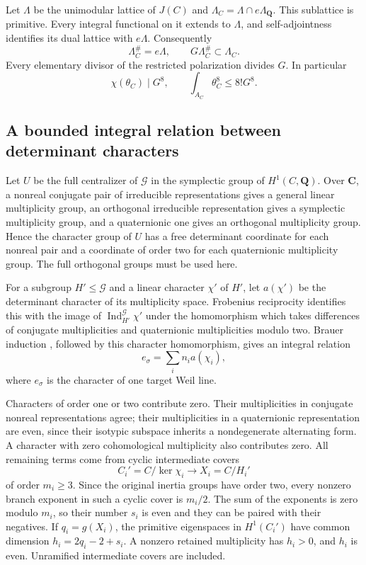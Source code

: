 \documentclass[11pt]{article}
\theoremstyle{definition}
\theoremstyle{remark}
\newcommand{\Q}{\mathbf Q}
\newcommand{\C}{\mathbf C}
\begin{document}
Let $\Lambda$ be the unimodular lattice of $J(C)$ and
$\Lambda_C=\Lambda\cap e\Lambda_\Q$. This sublattice is primitive.
Every integral functional on it extends to $\Lambda$, and
self-adjointness identifies its dual lattice with $e\Lambda$.
Consequently
\[
 \Lambda_C^{\#}=e\Lambda,\qquad
 G\Lambda_C^{\#}\subset\Lambda_C.
\]
Every elementary divisor of the restricted polarization divides $G$.
In particular
\begin{equation}\label{eq:eis-source-volume}
 \chi(\theta_C)\mid G^8,
 \qquad \int_{A_C}\theta_C^8\le8!G^8.
\end{equation}

\subsection{A bounded integral relation between determinant characters}

Let $U$ be the full centralizer of $\mathcal G$ in the symplectic group
of $H^1(C,\Q)$. Over $\C$, a nonreal conjugate pair of irreducible
representations gives a general linear multiplicity group, an orthogonal
irreducible representation gives a symplectic multiplicity group, and
a quaternionic one gives an orthogonal multiplicity group. Hence the
character group of $U$ has a free determinant coordinate for each
nonreal pair and a coordinate of order two for each quaternionic
multiplicity group. The full orthogonal groups must be used here.

For a subgroup $H'\le\mathcal G$ and a linear character $\chi'$ of
$H'$, let $a(\chi')$ be the determinant character of its multiplicity
space. Frobenius reciprocity identifies this with the image of
$\operatorname{Ind}_{H'}^{\mathcal G}\chi'$ under the homomorphism
which takes differences of conjugate multiplicities and quaternionic
multiplicities modulo two. Brauer induction \cite[\S10.5, Theorem~20, p.~78]{SerreRepresentations}, followed by this character homomorphism, gives an integral relation
\begin{equation}\label{eq:eis-supplier-relation}
 e_\sigma=\sum_i n_i a(\chi_i),
\end{equation}
where $e_\sigma$ is the character of one target Weil line.

Characters of order one or two contribute zero. Their multiplicities
in conjugate nonreal representations agree; their multiplicities in
a quaternionic representation are even, since their isotypic subspace
inherits a nondegenerate alternating form. A character with zero
cohomological multiplicity also contributes zero. All remaining terms
come from cyclic intermediate covers
\[
 C_i'=C/\ker\chi_i\longrightarrow X_i=C/H_i'
\]
of order $m_i\ge3$. Since the original inertia groups have order two,
every nonzero branch exponent in such a cyclic cover is $m_i/2$.
The sum of the exponents is zero modulo $m_i$, so their number $s_i$ is
even and they can be paired with their negatives. If $q_i=g(X_i)$,
the primitive eigenspaces in $H^1(C_i')$ have common dimension
$h_i=2q_i-2+s_i$. A nonzero retained multiplicity has $h_i>0$, and
$h_i$ is even. Unramified intermediate covers are included.
\end{document}
